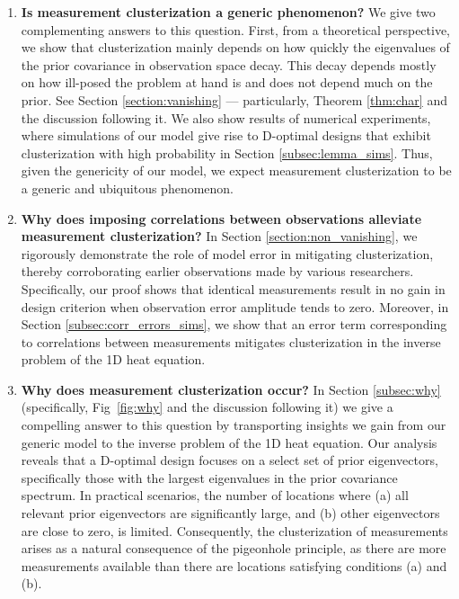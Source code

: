 \begin{enumerate}
\item \label{q:generic} \textbf{Is measurement clusterization a
  generic phenomenon?}
  We give two complementing answers to this question. First, from a
  theoretical perspective, we show that clusterization mainly depends
  on how quickly the eigenvalues of the prior covariance in
  observation space decay. This decay depends mostly on how ill-posed
  the problem at hand is and does not depend much on the prior. See
  Section \ref{section:vanishing} --- particularly, Theorem
  \ref{thm:char} and the discussion following it. We also show results
  of numerical experiments, where simulations of our model give rise
  to D-optimal designs that exhibit clusterization with high
  probability in Section \ref{subsec:lemma_sims}. Thus, given the
  genericity of our model, we expect measurement clusterization to be
  a generic and ubiquitous phenomenon.

\item \label{q:mitigate} \textbf{Why does imposing correlations
  between observations alleviate measurement clusterization?} In
  Section \ref{section:non_vanishing}, we rigorously demonstrate the
  role of model error in mitigating clusterization, thereby
  corroborating earlier observations made by various
  researchers. Specifically, our proof shows that identical
  measurements result in no gain in design criterion when observation
  error amplitude tends to zero. Moreover, in Section
  \ref{subsec:corr_errors_sims}, we show that an error term
  corresponding to correlations between measurements mitigates
  clusterization in the inverse problem of the 1D heat equation.

\item \label{q:why} \textbf{Why does measurement clusterization
  occur?} In Section \ref{subsec:why} (specifically, Fig~\ref{fig:why}
  and the discussion following it) we give a compelling answer to this
  question by transporting insights we gain from our generic model to
  the inverse problem of the 1D heat equation. Our analysis reveals
  that a D-optimal design focuses on a select set of prior
  eigenvectors, specifically those with the largest eigenvalues in the
  prior covariance spectrum. In practical scenarios, the number of
  locations where (a) all relevant prior eigenvectors are
  significantly large, and (b) other eigenvectors are close to zero,
  is limited. Consequently, the clusterization of measurements arises
  as a natural consequence of the pigeonhole principle, as there are
  more measurements available than there are locations satisfying
  conditions (a) and (b).

\end{enumerate}

